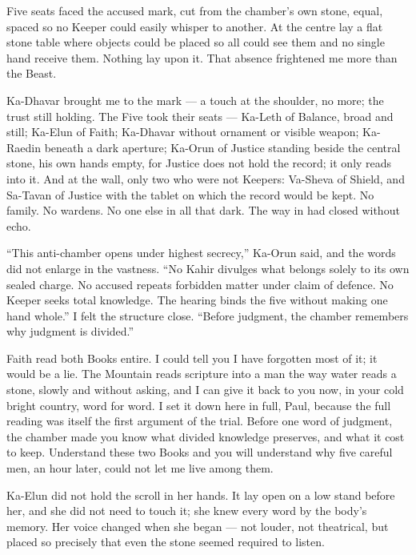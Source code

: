 Five seats faced the accused mark, cut from the chamber's own stone, equal, spaced so no Keeper could easily whisper to another. At the centre lay a flat stone table where objects could be placed so all could see them and no single hand receive them. Nothing lay upon it. That absence frightened me more than the Beast.\par
 
Ka-Dhavar brought me to the mark — a touch at the shoulder, no more; the trust still holding. The Five took their seats — Ka-Leth of Balance, broad and still; Ka-Elun of Faith; Ka-Dhavar without ornament or visible weapon; Ka-Raedin beneath a dark aperture; Ka-Orun of Justice standing beside the central stone, his own hands empty, for Justice does not hold the record; it only reads into it. And at the wall, only two who were not Keepers: Va-Sheva of Shield, and Sa-Tavan of Justice with the tablet on which the record would be kept. No family. No wardens. No one else in all that dark. The way in had closed without echo.\par
 
``This anti-chamber opens under highest secrecy,'' Ka-Orun said, and the words did not enlarge in the vastness. ``No Kahir divulges what belongs solely to its own sealed charge. No accused repeats forbidden matter under claim of defence. No Keeper seeks total knowledge. The hearing binds the five without making one hand whole.'' I felt the structure close. ``Before judgment, the chamber remembers why judgment is divided.''\par
 
Faith read both Books entire. I could tell you I have forgotten most of it; it would be a lie. The Mountain reads scripture into a man the way water reads a stone, slowly and without asking, and I can give it back to you now, in your cold bright country, word for word. I set it down here in full, Paul, because the full reading was itself the first argument of the trial. Before one word of judgment, the chamber made you know what divided knowledge preserves, and what it cost to keep. Understand these two Books and you will understand why five careful men, an hour later, could not let me live among them.\par
 
Ka-Elun did not hold the scroll in her hands. It lay open on a low stand before her, and she did not need to touch it; she knew every word by the body's memory. Her voice changed when she began — not louder, not theatrical, but placed so precisely that even the stone seemed required to listen.\par
 

